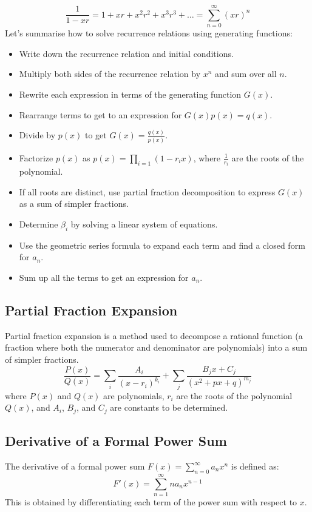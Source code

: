 \[ \frac{1}{1 - xr} = 1 + xr + x^2r^2 + x^3r^3 + \ldots = \sum_{n=0}^{\infty} (xr)^n \]
Let's summarise how to solve recurrence relations using generating functions:
\begin{itemize}[itemsep=1pt,label=$\circ$]
    \item Write down the recurrence relation and initial conditions.
    \item Multiply both sides of the recurrence relation by $x^n$ and sum over all $n$.
    \item Rewrite each expression in terms of the generating function $G(x)$.
    \item Rearrange terms to get to an expression for $G(x)p(x) = q(x)$.
    \item Divide by $p(x)$ to get $G(x) = \frac{q(x)}{p(x)}$.
    \item Factorize $p(x)$ as $p(x) = \prod_{i=1} (1 - r_ix)$, where $\frac{1}{r_i}$ are the roots of the polynomial.
    \item If all roots are distinct, use partial fraction decomposition to express $G(x)$ as a sum of simpler fractions.
    \item Determine $\beta_i$ by solving a linear system of equations.
    \item Use the geometric series formula to expand each term and find a closed form for $a_n$.
    \item Sum up all the terms to get an expression for $a_n$.
\end{itemize}

\subsection{Partial Fraction Expansion}
\begin{definition}
    Partial fraction expansion is a method used to decompose a rational function (a fraction where both the numerator and denominator are polynomials) into a sum of simpler fractions.
    \[ \frac{P(x)}{Q(x)} = \sum_{i} \frac{A_i}{(x - r_i)^{k_i}} + \sum_{j} \frac{B_j x + C_j}{(x^2 + px + q)^{m_j}} \]
    where $P(x)$ and $Q(x)$ are polynomials, $r_i$ are the roots of the polynomial $Q(x)$, and $A_i$, $B_j$, and $C_j$ are constants to be determined.
\end{definition}

\subsection{Derivative of a Formal Power Sum}
\begin{definition}
    The derivative of a formal power sum $F(x) = \sum_{n=0}^{\infty} a_n x^n$ is defined as:
    \[ F'(x) = \sum_{n=1}^{\infty} n a_n x^{n-1} \]
    This is obtained by differentiating each term of the power sum with respect to $x$.
\end{definition}

